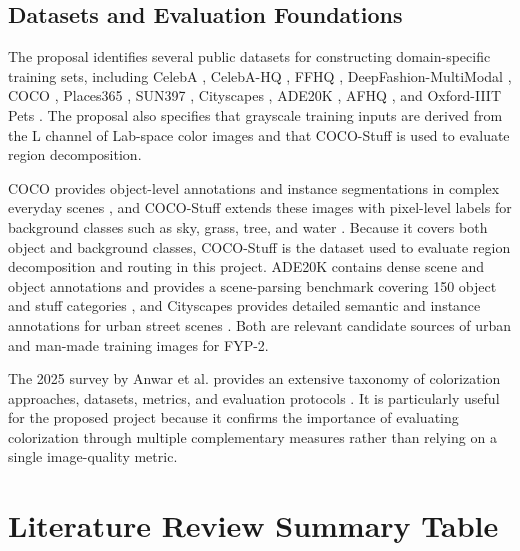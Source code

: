 \documentclass{FastFyp}
\begin{document}
\subsection{Datasets and Evaluation Foundations}

The proposal identifies several public datasets for constructing domain-specific training sets, including CelebA \cite{celeba2015}, CelebA-HQ \cite{pggan2018}, FFHQ \cite{ffhq2019}, DeepFashion-MultiModal \cite{text2human2022}, COCO \cite{ref19}, Places365 \cite{places365}, SUN397 \cite{sun397}, Cityscapes \cite{ref20}, ADE20K \cite{ref18}, AFHQ \cite{afhq2020}, and Oxford-IIIT Pets \cite{pets2012}. The proposal also specifies that grayscale training inputs are derived from the L channel of Lab-space color images and that COCO-Stuff \cite{caesar2018cocostuff} is used to evaluate region decomposition.

COCO provides object-level annotations and instance segmentations in complex everyday scenes \cite{ref19}, and COCO-Stuff extends these images with pixel-level labels for background classes such as sky, grass, tree, and water \cite{caesar2018cocostuff}. Because it covers both object and background classes, COCO-Stuff is the dataset used to evaluate region decomposition and routing in this project. ADE20K contains dense scene and object annotations and provides a scene-parsing benchmark covering 150 object and stuff categories \cite{ref18}, and Cityscapes provides detailed semantic and instance annotations for urban street scenes \cite{ref20}. Both are relevant candidate sources of urban and man-made training images for FYP-2.

The 2025 survey by Anwar et al. provides an extensive taxonomy of colorization approaches, datasets, metrics, and evaluation protocols \cite{ref21}. It is particularly useful for the proposed project because it confirms the importance of evaluating colorization through multiple complementary measures rather than relying on a single image-quality metric.


\section{Literature Review Summary Table}
\end{document}
